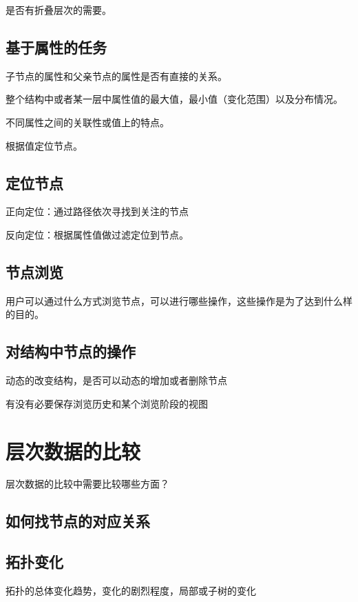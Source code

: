 \documentclass{article}
\begin{document}
是否有折叠层次的需要。

\subsection{基于属性的任务}

子节点的属性和父亲节点的属性是否有直接的关系。

整个结构中或者某一层中属性值的最大值，最小值（变化范围）以及分布情况。

不同属性之间的关联性或值上的特点。

根据值定位节点。

\subsection{定位节点}

正向定位：通过路径依次寻找到关注的节点

反向定位：根据属性值做过滤定位到节点。

\subsection{节点浏览}

用户可以通过什么方式浏览节点，可以进行哪些操作，这些操作是为了达到什么样的目的。

\subsection{对结构中节点的操作}

动态的改变结构，是否可以动态的增加或者删除节点

有没有必要保存浏览历史和某个浏览阶段的视图


\section{层次数据的比较}

层次数据的比较中需要比较哪些方面？

\subsection{如何找节点的对应关系}

\subsection{拓扑变化}

拓扑的总体变化趋势，变化的剧烈程度，局部或子树的变化
\end{document}
